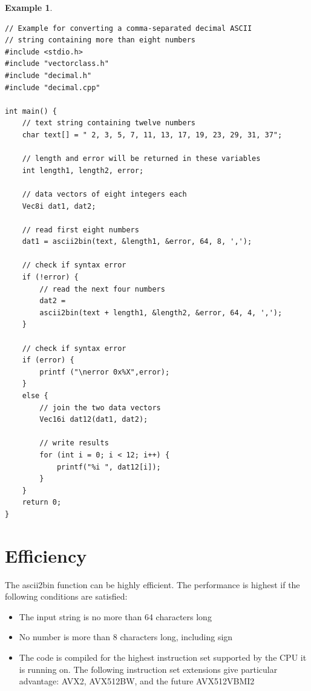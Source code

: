 \documentclass[11pt,a4paper,oneside,openright]{report}
\newtheorem{example}{Example}[chapter]  %
\newcommand{\vspacesmall}{\vspace{3mm}}
\begin{document}
\begin{example}
\label{example3}
\end{example} %
\begin{lstlisting}[frame=single]
// Example for converting a comma-separated decimal ASCII 
// string containing more than eight numbers
#include <stdio.h>
#include "vectorclass.h"        
#include "decimal.h" 
#include "decimal.cpp"

int main() {
    // text string containing twelve numbers
    char text[] = " 2, 3, 5, 7, 11, 13, 17, 19, 23, 29, 31, 37";

    // length and error will be returned in these variables
    int length1, length2, error;

    // data vectors of eight integers each
    Vec8i dat1, dat2;

    // read first eight numbers
    dat1 = ascii2bin(text, &length1, &error, 64, 8, ',');

    // check if syntax error
    if (!error) {
        // read the next four numbers
        dat2 = 
        ascii2bin(text + length1, &length2, &error, 64, 4, ',');
    }

    // check if syntax error
    if (error) {    
        printf ("\nerror 0x%X",error);
    }
    else {
        // join the two data vectors
        Vec16i dat12(dat1, dat2);

        // write results
        for (int i = 0; i < 12; i++) {
            printf("%i ", dat12[i]);
        }
    }
    return 0;
}
\end{lstlisting}
\vspacesmall


\section{Efficiency} \label{Efficiency}

The ascii2bin function can be highly efficient. The performance is highest if the following conditions are satisfied:

\begin{itemize}
  \item The input string is no more than 64 characters long
  \item No number is more than 8 characters long, including sign
  \item The code is compiled for the highest instruction set supported by the CPU it is running on. The following instruction set extensions give particular advantage: AVX2, AVX512BW, and the future AVX512VBMI2\end{itemize}
\vspacesmall
\end{document}
